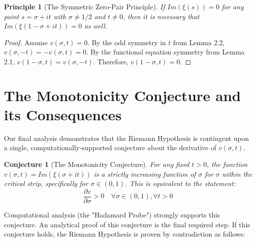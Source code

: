 \documentclass{article}
\newtheorem{principle}[theorem]{Principle}
\newtheorem{conjecture}[theorem]{Conjecture}
\begin{document}
\begin{principle}[The Symmetric Zero-Pair Principle]
If $Im(\xi(s)) = 0$ for any point $s = \sigma + it$ with $\sigma \neq 1/2$ and $t \neq 0$, then it is necessary that $Im(\xi(1-\sigma+it)) = 0$ as well.
\end{principle}
\begin{proof}
Assume $v(\sigma, t) = 0$. By the odd symmetry in $t$ from Lemma 2.2, $v(\sigma, -t) = -v(\sigma, t) = 0$. By the functional equation symmetry from Lemma 2.1, $v(1-\sigma, t) = v(\sigma, -t)$. Therefore, $v(1-\sigma, t) = 0$.
\end{proof}

\section{The Monotonicity Conjecture and its Consequences}
Our final analysis demonstrates that the Riemann Hypothesis is contingent upon a single, computationally-supported conjecture about the derivative of $v(\sigma, t)$.

\begin{conjecture}[The Monotonicity Conjecture]
For any fixed $t > 0$, the function $v(\sigma, t) = Im(\xi(\sigma+it))$ is a strictly increasing function of $\sigma$ for $\sigma$ within the critical strip, specifically for $\sigma \in (0, 1)$. This is equivalent to the statement:
$$ \frac{\partial v}{\partial \sigma} > 0 \quad \forall \sigma \in (0,1), \forall t > 0 $$
\end{conjecture}
Computational analysis (the "Hadamard Probe") strongly supports this conjecture. An analytical proof of this conjecture is the final required step. If this conjecture holds, the Riemann Hypothesis is proven by contradiction as follows:
\end{document}

